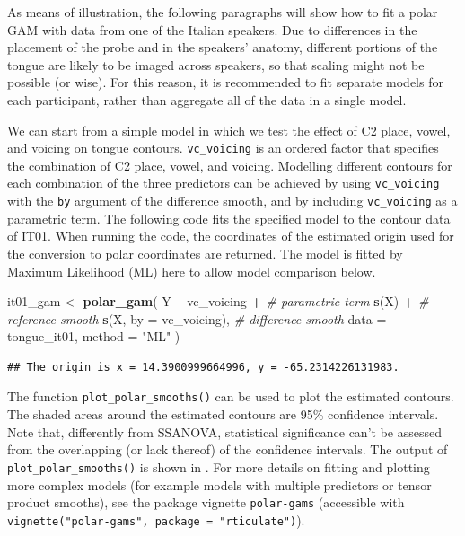 \documentclass[11pt,]{article}
\newenvironment{Shaded}{\begin{snugshade}}{\end{snugshade}}
\newcommand{\CommentTok}[1]{\textcolor[rgb]{0.56,0.35,0.01}{\textit{#1}}}
\newcommand{\DataTypeTok}[1]{\textcolor[rgb]{0.13,0.29,0.53}{#1}}
\newcommand{\KeywordTok}[1]{\textcolor[rgb]{0.13,0.29,0.53}{\textbf{#1}}}
\newcommand{\NormalTok}[1]{#1}
\newcommand{\OperatorTok}[1]{\textcolor[rgb]{0.81,0.36,0.00}{\textbf{#1}}}
\newcommand{\StringTok}[1]{\textcolor[rgb]{0.31,0.60,0.02}{#1}}
\begin{document}
As means of illustration, the following paragraphs will show how to fit
a polar GAM with data from one of the Italian speakers. Due to
differences in the placement of the probe and in the speakers' anatomy,
different portions of the tongue are likely to be imaged across
speakers, so that scaling might not be possible (or wise). For this
reason, it is recommended to fit separate models for each participant,
rather than aggregate all of the data in a single model.

We can start from a simple model in which we test the effect of C2
place, vowel, and voicing on tongue contours. \texttt{vc\_voicing} is an
ordered factor that specifies the combination of C2 place, vowel, and
voicing. Modelling different contours for each combination of the three
predictors can be achieved by using \texttt{vc\_voicing} with the
\texttt{by} argument of the difference smooth, and by including
\texttt{vc\_voicing} as a parametric term. The following code fits the
specified model to the contour data of IT01. When running the code, the
coordinates of the estimated origin used for the conversion to polar
coordinates are returned. The model is fitted by Maximum Likelihood (ML)
here to allow model comparison below.

\begin{Shaded}
\begin{Highlighting}[]
\NormalTok{it01_gam <-}\StringTok{ }\KeywordTok{polar_gam}\NormalTok{(}
\NormalTok{  Y }\OperatorTok{~}
\StringTok{    }\NormalTok{vc_voicing }\OperatorTok{+}\StringTok{            }\CommentTok{# parametric term}
\StringTok{    }\KeywordTok{s}\NormalTok{(X) }\OperatorTok{+}\StringTok{                  }\CommentTok{# reference smooth}
\StringTok{    }\KeywordTok{s}\NormalTok{(X, }\DataTypeTok{by =}\NormalTok{ vc_voicing),  }\CommentTok{# difference smooth}
  \DataTypeTok{data =}\NormalTok{ tongue_it01,}
  \DataTypeTok{method =} \StringTok{"ML"}
\NormalTok{)}
\end{Highlighting}
\end{Shaded}

\begin{verbatim}
## The origin is x = 14.3900999664996, y = -65.2314226131983.
\end{verbatim}

The function \texttt{plot\_polar\_smooths()} can be used to plot the
estimated contours. The shaded areas around the estimated contours are
95\% confidence intervals. Note that, differently from SSANOVA,
statistical significance can't be assessed from the overlapping (or lack
thereof) of the confidence intervals. The output of
\texttt{plot\_polar\_smooths()} is shown in . For
more details on fitting and plotting more complex models (for example
models with multiple predictors or tensor product smooths), see the
package vignette \texttt{polar-gams} (accessible with
\texttt{vignette("polar-gams",\ package\ =\ "rticulate")}).
\end{document}
